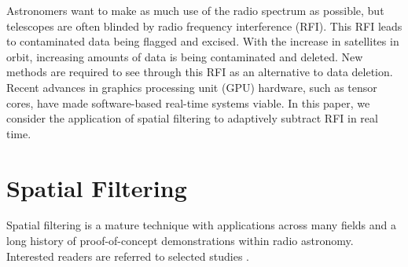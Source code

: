 \documentclass[11pt,twoside]{article}
\begin{document}
Astronomers want to make as much use of the radio spectrum as possible, but telescopes are often blinded by radio frequency interference (RFI). 
This RFI leads to contaminated data being flagged and excised. With the increase in satellites in orbit, increasing amounts of data is being contaminated and deleted. 
New methods are required to see through this RFI as an alternative to data deletion. Recent advances in graphics processing unit (GPU) hardware, such as tensor cores,
have made software-based real-time systems viable. In this paper, we consider the application of spatial filtering to adaptively subtract RFI in real time.


\section{Spatial Filtering}
\label{sec:beamforming}


Spatial filtering is a mature technique with applications across many
fields and a long history of proof-of-concept demonstrations within radio astronomy.
Interested readers are referred to selected studies \citep{leshem_multichannel_2000,kocz_radio_2010,chippendale_interference_2017,lourenco_mitigation_2024,whipple_wideband_2023}.

\end{document}
